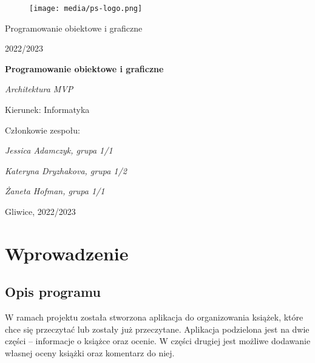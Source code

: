 \documentclass[12pt,a4paper]{article}
\begin{document}
\clearpage
\begin{figure}[h]
\centering
\texttt{[image: media/ps-logo.png]}
\end{figure}
\hspace{3cm}
\begin{center}Programowanie obiektowe i graficzne\end{center}
\begin{center}2022/2023\end{center}
\hspace{3cm}
\begin{center}\large\textbf{Programowanie obiektowe i graficzne}\end{center}
\begin{center}\large\textit{Architektura MVP
}\end{center}

\hspace{7cm}
\begin{flushright}Kierunek: Informatyka
\end{flushright}
\begin{flushright}Członkowie zespołu:
\par
\textit{Jessica Adamczyk, grupa 1/1}
\par
\textit{Kateryna Dryzhakova, grupa 1/2}
\par
\textit{Żaneta Hofman, grupa 1/1}
\end{flushright}
\vfill
\begin{center}Gliwice, 2022/2023\end{center}

\newpage
{}
\tableofcontents

\newpage
\section{Wprowadzenie}

\subsection{Opis programu}
W ramach projektu została stworzona aplikacja do organizowania książek, które chce się przeczytać lub zostały już przeczytane. Aplikacja podzielona jest na dwie części – informacje o książce oraz ocenie. W części drugiej jest możliwe dodawanie własnej oceny książki oraz komentarz do niej.
\end{document}
